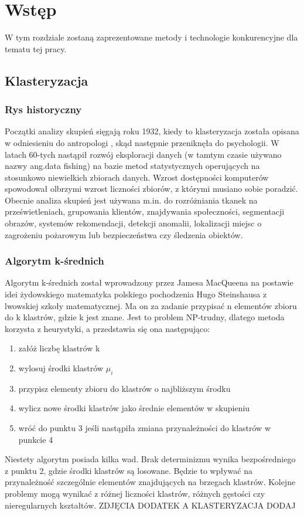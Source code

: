 \chapter{Wstęp}
\label{cha:wstep}

W tym rozdziale zostaną zaprezentowane metody i technologie konkurencyjne dla tematu tej pracy.

\section{Klasteryzacja}
\label{sec:klasteryzacja}

\subsection{Rys historyczny}
Początki analizy skupień sięgają roku 1932, kiedy to klasteryzacja została opisana w odniesieniu do antropologi \cite{Dri32}, skąd następnie przeniknęła do psychologii. W latach 60-tych nastąpił rozwój eksploracji danych (w tamtym czasie używano nazwy ang.data fishing) na bazie metod statystycznych operujących na stosunkowo niewielkich zbiorach danych. Wzrost dostępności komputerów spowodował olbrzymi wzrost liczności zbiorów, z którymi musiano sobie poradzić. Obecnie analiza skupień jest używana m.in. do rozróżniania tkanek na prześwietleniach, grupowania klientów, znajdywania społeczności, segmentacji obrazów, systemów rekomendacji, detekcji anomalii, lokalizacji miejsc o zagrożeniu pożarowym lub bezpieczeństwa czy śledzenia obiektów.

\subsection{Algorytm k-średnich}
Algorytm k-średnich został wprowadzony przez Jamesa MacQueena \cite{Mac67} na postawie idei żydowskiego matematyka polskiego pochodzenia Hugo Steinshausa z lwowskiej szkoły matematycznej.\newline
Ma on za zadanie przypisać n elementów zbioru do k klastrów, gdzie k jest znane. Jest to problem NP-trudny, dlatego metoda korzysta z heurystyki, a przedstawia się ona następująco:
\begin{enumerate}
	\item{załóż liczbę klastrów k}
	\item{wylosuj środki klastrów $\mu_i$}
	\item{przypisz elementy zbioru do klastrów o najbliższym środku}
	\item{wylicz nowe środki klastrów jako średnie elementów w skupieniu}
	\item{wróć do punktu 3 jeśli nastąpiła zmiana przynależności do klastrów w punkcie 4}
\end{enumerate}
Niestety algorytm posiada kilka wad. Brak determinizmu wynika bezpośredniego z punktu 2, gdzie środki klastrów są losowane. Będzie to wpływać na przynależność szczególnie elementów znajdujących na brzegach klastrów. Kolejne problemy mogą wynikać z różnej liczności klastrów, różnych gęstości czy nieregularnych kształtów. ZDJĘCIA DODATEK A KLASTERYZACJA DODAJ

